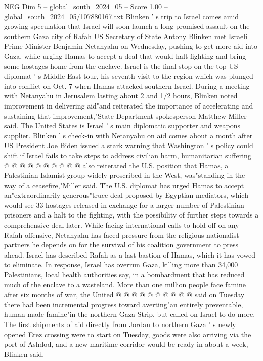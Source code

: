 \begin{textsample}{NEG Dim 5 – global\_south\_2024\_05 – Score 1.00 – global\_south\_2024\_05/107880167.txt}  \label{ex:f5_neg_388}
Blinken ' s trip to Israel comes amid growing speculation that Israel will soon launch a long-promised assault on the southern Gaza city of Rafah US Secretary of State Antony Blinken met Israeli Prime Minister Benjamin Netanyahu on Wednesday, pushing to get more aid into Gaza, while urging Hamas to accept a deal that would halt fighting and bring some hostages home from the enclave.
Israel is the final stop on the top US diplomat ' s Middle East tour, his seventh visit to the region which was plunged into conflict on Oct. 7 when Hamas attacked southern Israel.
During a meeting with Netanyahu in Jerusalem lasting about 2 and 1/2 hours, Blinken noted improvement in delivering aid"and reiterated the importance of accelerating and sustaining that improvement,"State Department spokesperson Matthew Miller said.
The United States is Israel ' s main diplomatic supporter and weapons supplier.
Blinken ' s check-in with Netanyahu on aid comes about a month after US President Joe Biden issued a stark warning that Washington ' s policy could shift if Israel fails to take steps to address civilian harm, humanitarian suffering @ @ @ @ @ @ @ @ @ @ also reiterated the U.S. position that Hamas, a Palestinian Islamist group widely proscribed in the West, was"standing in the way of a ceasefire,"Miller said.
The U.S. diplomat has urged Hamas to accept an"extraordinarily generous"truce deal proposed by Egyptian mediators, which would see 33 hostages released in exchange for a larger number of Palestinian prisoners and a halt to the fighting, with the possibility of further steps towards a comprehensive deal later.
While facing international calls to hold off on any Rafah offensive, Netanyahu has faced pressure from the religious nationalist partners he depends on for the survival of his coalition government to press ahead.
Israel has described Rafah as a last bastion of Hamas, which it has vowed to eliminate.
In response, Israel has overrun Gaza, killing more than 34,000 Palestinians, local health authorities say, in a bombardment that has reduced much of the enclave to a wasteland.
More than one million people face famine after six months of war, the United @ @ @ @ @ @ @ @ @ @ said on Tuesday there had been incremental progress toward averting"an entirely preventable, human-made famine"in the northern Gaza Strip, but called on Israel to do more.
The first shipments of aid directly from Jordan to northern Gaza ' s newly opened Erez crossing were to start on Tuesday, goods were also arriving via the port of Ashdod, and a new maritime corridor would be ready in about a week, Blinken said.

\end{textsample}
